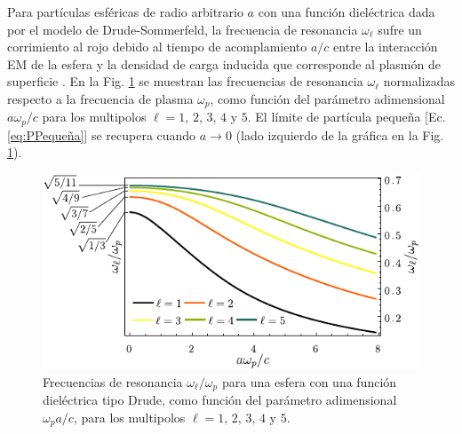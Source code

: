Para partículas esféricas de radio arbitrario $a$ con una función dieléctrica dada por el modelo de Drude-Sommerfeld, la frecuencia de resonancia $\omega_\ell$ sufre un corrimiento al rojo debido al tiempo de acomplamiento $a/c$ entre la interacción EM de la esfera y  la densidad de carga inducida que corresponde al plasmón de superficie \cite{aizpurua1998coupling}.  En la Fig.  \ref{fig:NormalModes} se muestran las frecuencias de resonancia $\omega_\ell$ normalizadas respecto a la frecuencia de plasma $\omega_p$, como función del parámetro adimensional $a\omega_p / c$ para los multipolos $\ell = 1,\,2,\,3,\,4$ y $5$. El límite de partícula pequeña [Ec.  \eqref{eq:PPequeña}]	se recupera cuando  $a\to 0$ (lado izquierdo de la gráfica en la Fig.  \ref{fig:NormalModes}).  

	\begin{figure}[h!]\centering
		\includegraphics[scale=1.15]{1-Teoria/figs/1-4-DrudeMultipoles.pdf}\vspace*{-1em}
	\caption{Frecuencias de resonancia $\omega_\ell/\omega_p$ para una esfera con una función dieléctrica tipo Drude, como función del parámetro adimensional  $\omega_p a / c$, para los multipolos $\ell = 1,\,2,\,3,\,4$ y $5$. }
	\label{fig:NormalModes}
	\end{figure}		

